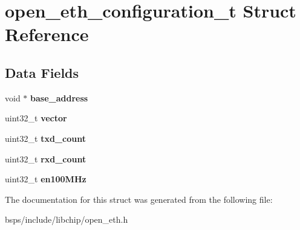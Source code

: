 \hypertarget{structopen__eth__configuration__t}{}\section{open\+\_\+eth\+\_\+configuration\+\_\+t Struct Reference}
\label{structopen__eth__configuration__t}
\subsection*{Data Fields}
\begin{DoxyCompactItemize}
\item 
\mbox{\label{structopen__eth__configuration__t_ac48080ef33aa973b6d4b327cfd84ea0e}} 
void $\ast$ {\bfseries base\+\_\+address}
\item 
\mbox{\label{structopen__eth__configuration__t_aa96a5ef5b89094ccf4cae4502afc5dea}} 
uint32\+\_\+t {\bfseries vector}
\item 
\mbox{\label{structopen__eth__configuration__t_aeb250f91142fc5b13a81c3734e739cb9}} 
uint32\+\_\+t {\bfseries txd\+\_\+count}
\item 
\mbox{\label{structopen__eth__configuration__t_adc988493175fa3a3f7a99d68f67feca1}} 
uint32\+\_\+t {\bfseries rxd\+\_\+count}
\item 
\mbox{\label{structopen__eth__configuration__t_a944faa8d02b471c6548bb2f666f98641}} 
uint32\+\_\+t {\bfseries en100\+M\+Hz}
\end{DoxyCompactItemize}


The documentation for this struct was generated from the following file\+:\begin{DoxyCompactItemize}
\item 
bsps/include/libchip/open\+\_\+eth.\+h\end{DoxyCompactItemize}
